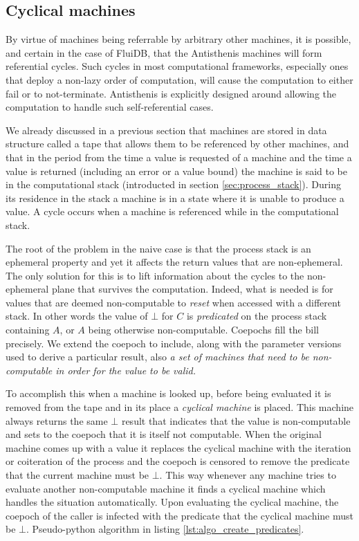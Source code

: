 \subsection{Cyclical machines}
\label{sec:cyclical_machines}

By virtue of machines being referrable by arbitrary other machines, it
is possible, and certain in the case of FluiDB, that the Antisthenis
machines will form referential cycles. Such cycles in most
computational frameworks, especially ones that deploy a non-lazy order
of computation, will cause the computation to either fail or to
not-terminate. Antisthenis is explicitly designed around allowing the
computation to handle such self-referential cases.

We already discussed in a previous section that machines are stored in
data structure called a tape that allows them to be referenced by
other machines, and that in the period from the time a value is
requested of a machine and the time a value is returned (including an
error or a value bound) the machine is said to be in the computational
stack (introducted in section \ref{sec:process_stack}). During its
residence in the stack a machine is in a state where it is unable to
produce a value. A cycle occurs when a machine is referenced while in
the computational stack.

The root of the problem in the naive case is that the process stack is
an ephemeral property and yet it affects the return values that are
non-ephemeral. The only solution for this is to lift information about
the cycles to the non-ephemeral plane that survives the
computation. Indeed, what is needed is for values that are deemed
non-computable to \emph{reset} when accessed with a different
stack. In other words the value of \(\bot\) for \(C\) is
\emph{predicated} on the process stack containing \(A\), or \(A\)
being otherwise non-computable. Coepochs fill the bill precisely. We
extend the coepoch to include, along with the parameter versions used
to derive a particular result, also \emph{a set of machines that need
  to be non-computable in order for the value to be valid.}

To accomplish this when a machine is looked up, before being evaluated
it is removed from the tape and in its place a \emph{cyclical machine}
is placed. This machine always returns the same \(\bot\) result that
indicates that the value is non-computable and sets to the coepoch
that it is itself not computable. When the original machine comes up
with a value it replaces the cyclical machine with the iteration or
coiteration of the process and the coepoch is censored to remove the
predicate that the current machine must be \(\bot\). This way whenever
any machine tries to evaluate another non-computable machine it finds
a cyclical machine which handles the situation automatically. Upon
evaluating the cyclical machine, the coepoch of the caller is infected
with the predicate that the cyclical machine must be
\(\bot\). Pseudo-python algorithm in listing
\ref{lst:algo_create_predicates}.

